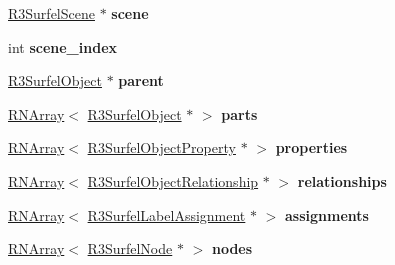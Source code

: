 \begin{DoxyCompactItemize}
\item 
\hyperlink{class_r3_surfel_scene}{R3\+Surfel\+Scene} $\ast$ {\bfseries scene}\hypertarget{class_r3_surfel_object_a2d395fb9674ba292b003107dcaa3facd}{}\label{class_r3_surfel_object_a2d395fb9674ba292b003107dcaa3facd}

\item 
int {\bfseries scene\+\_\+index}\hypertarget{class_r3_surfel_object_ac0060c71086b866753bcb7cb175e5a5f}{}\label{class_r3_surfel_object_ac0060c71086b866753bcb7cb175e5a5f}

\item 
\hyperlink{class_r3_surfel_object}{R3\+Surfel\+Object} $\ast$ {\bfseries parent}\hypertarget{class_r3_surfel_object_ae61453677e68f1c6a9eabca21d694653}{}\label{class_r3_surfel_object_ae61453677e68f1c6a9eabca21d694653}

\item 
\hyperlink{class_r_n_array}{R\+N\+Array}$<$ \hyperlink{class_r3_surfel_object}{R3\+Surfel\+Object} $\ast$ $>$ {\bfseries parts}\hypertarget{class_r3_surfel_object_ae3bf45bd87eafe3f2d35b45af01847d5}{}\label{class_r3_surfel_object_ae3bf45bd87eafe3f2d35b45af01847d5}

\item 
\hyperlink{class_r_n_array}{R\+N\+Array}$<$ \hyperlink{class_r3_surfel_object_property}{R3\+Surfel\+Object\+Property} $\ast$ $>$ {\bfseries properties}\hypertarget{class_r3_surfel_object_a3bf767f1034ab46695d04ec0e2cdee10}{}\label{class_r3_surfel_object_a3bf767f1034ab46695d04ec0e2cdee10}

\item 
\hyperlink{class_r_n_array}{R\+N\+Array}$<$ \hyperlink{class_r3_surfel_object_relationship}{R3\+Surfel\+Object\+Relationship} $\ast$ $>$ {\bfseries relationships}\hypertarget{class_r3_surfel_object_a02536001a23969228db3cfe798db8c7d}{}\label{class_r3_surfel_object_a02536001a23969228db3cfe798db8c7d}

\item 
\hyperlink{class_r_n_array}{R\+N\+Array}$<$ \hyperlink{class_r3_surfel_label_assignment}{R3\+Surfel\+Label\+Assignment} $\ast$ $>$ {\bfseries assignments}\hypertarget{class_r3_surfel_object_acbf5de5297cdb3982257148a2384cf8f}{}\label{class_r3_surfel_object_acbf5de5297cdb3982257148a2384cf8f}

\item 
\hyperlink{class_r_n_array}{R\+N\+Array}$<$ \hyperlink{class_r3_surfel_node}{R3\+Surfel\+Node} $\ast$ $>$ {\bfseries nodes}\hypertarget{class_r3_surfel_object_a8539488e499804e97cda489d16409176}{}\label{class_r3_surfel_object_a8539488e499804e97cda489d16409176}


\end{DoxyCompactItemize}
